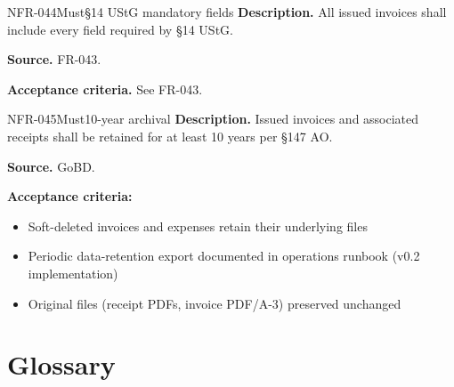 \documentclass[11pt,a4paper]{article}
\begin{document}
\begin{requirement}{NFR-044}{Must}{\S14 UStG mandatory fields}
\textbf{Description.} All issued invoices shall include every field required by \S14 UStG.

\textbf{Source.} FR-043.

\textbf{Acceptance criteria.} See FR-043.
\end{requirement}

\begin{requirement}{NFR-045}{Must}{10-year archival}
\textbf{Description.} Issued invoices and associated receipts shall be retained for at least 10 years per \S147 AO.

\textbf{Source.} GoBD.

\textbf{Acceptance criteria:}
\begin{itemize}
    \item Soft-deleted invoices and expenses retain their underlying files
    \item Periodic data-retention export documented in operations runbook (v0.2 implementation)
    \item Original files (receipt PDFs, invoice PDF/A-3) preserved unchanged
\end{itemize}
\end{requirement}

\appendix

\section{Glossary}
\end{document}
